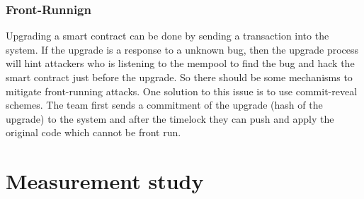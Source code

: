 \subsubsection{Front-Runnign}
Upgrading a smart contract can be done by sending a transaction into the system. If the upgrade is a response to a unknown bug, then the upgrade process will hint attackers who is listening to the mempool to find the bug and hack the smart contract just before the upgrade. So there should be some mechanisms to mitigate front-running attacks. One solution to this issue is to use commit-reveal schemes. The team first sends a commitment of the upgrade (hash of the upgrade) to the system and after the timelock they can push and apply the original code which cannot be front run. 





 \section{Measurement study}






